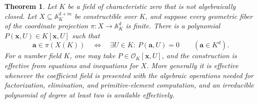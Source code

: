 \documentclass[11pt]{article}
\newtheorem{theorem}{Theorem}[section]
\theoremstyle{definition}
\begin{document}
\begin{theorem}\label{thm:finite-fibre-arbitrary-field}
Let $K$ be a field of characteristic zero that is not algebraically
closed. Let $X\subseteq\mathbb A^{d+m}_K$ be constructible over $K$,
and suppose every geometric fiber of the coordinate projection
$\pi:X\to\mathbb A^d_K$ is finite. There is a polynomial
$P(\mathbf x,U)\in K[\mathbf x,U]$ such that
\[
 \mathbf a\in\pi(X(K))
 \quad\Longleftrightarrow\quad
 \exists U\in K:\ P(\mathbf a,U)=0
 \qquad(\mathbf a\in K^d).
\]
For a number field $K$, one may take $P\in\mathcal O_K[\mathbf x,U]$,
and the construction is effective from equations and inequations for
$X$. More generally it is effective whenever the coefficient field is
presented with the algebraic operations needed for factorization,
elimination, and primitive-element computation, and an irreducible
polynomial of degree at least two is available effectively.
\end{theorem}
\end{document}
